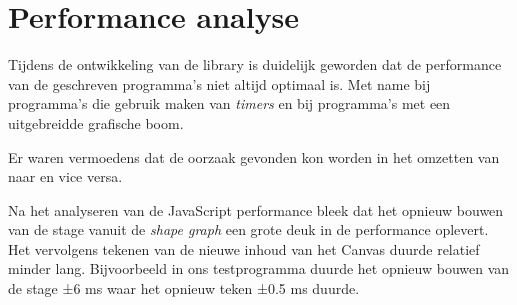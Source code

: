 \section{Performance analyse}
Tijdens de ontwikkeling van de library is duidelijk geworden dat de performance van de geschreven programma's niet altijd optimaal is. Met name bij programma's die gebruik maken van \emph{timers} en bij programma's met een uitgebreidde grafische boom.


Er waren vermoedens dat de oorzaak gevonden kon worden in het omzetten van  naar  en vice versa.

Na het analyseren van de JavaScript performance bleek dat het opnieuw bouwen van de stage vanuit de \emph{shape graph} een grote deuk in de performance oplevert. Het vervolgens tekenen van de nieuwe inhoud van het Canvas duurde relatief minder lang. Bijvoorbeeld in ons testprogramma duurde het opnieuw bouwen van de stage ±6 ms waar het opnieuw teken ±0.5 ms duurde.



